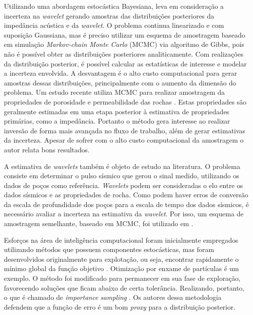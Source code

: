 Utilizando uma abordagem estocástica Bayesiana, \cite{leandro_SEG} leva em
consideração a incerteza na \textit{wavelet} gerando amostras das distribuições
posteriores da impedância acústica e da \textit{wavelet}. O problema continua
linearizado e com suposição Gaussiana, mas é preciso utilizar um esquema de
amostragem baseado em simulação \textit{Markov-chain Monte Carlo} (MCMC) via
algoritmo de Gibbs, pois não é possível obter as distribuições posteriores
analiticamente. Com realizações da distribuição posterior, é possível calcular
as estatísticas de interesse e modelar a incerteza envolvida. A desvantagem é o
alto custo computacional para gerar amostras dessas distribuições,
principalmente com o aumento da dimensão do problema. Um estudo recente utiliza
MCMC para realizar amostragem da propriedades de porosidade e permeabilidade das
rochas \citep{zunino2014}. Estas propriedades são geralmente estimadas em uma
etapa posterior à estimativa de propriedades primárias, como a impedância.
Portanto o método gera interesse ao realizar inversão de forma mais avançada no
fluxo de trabalho, além de gerar estimativas da incerteza. Apesar de sofrer com
o alto custo computacional da amostragem o autor relata bons resultados.

A estimativa de \textit{wavelets} também é objeto de estudo na literatura. O
problema consiste em determinar o pulso sísmico que gerou o sinal medido,
utilizando os dados de poços como referência. \textit{Wavelets} podem ser
consideradas o elo entre os dados sísmicos e as propriedades de rocha. Como
podem haver erros de conversão da escala de profundidade dos poços para a escala
de tempo dos dados sísmicos, é necessário avaliar a incerteza na estimativa da
\textit{wavelet}. Por isso, um esquema de amostragem semelhante, baseado em 
MCMC, foi utilizado em \cite{BulandWavStochastic}.

Esforços na área de inteligência computacional foram inicialmente empregados
utilizando métodos que possuem componentes estocásticas, mas foram desenvolvidos
originalmente para explotação, ou seja, encontrar rapidamente o mínimo global da
função objetivo \citep{Sen1995v}. Otimização por enxame de partículas é um
exemplo. O método foi modificado para permanecer em sua fase de exploração,
favorecendo soluções que ficam abaixo de certa tolerância. Realizando, portanto,
o que é chamado de \textit{importance sampling} \citep{Martinez:2010PSO}. Os
autores dessa metodologia defendem que a função de erro é um bom \textit{proxy}
para a distribuição posterior.

